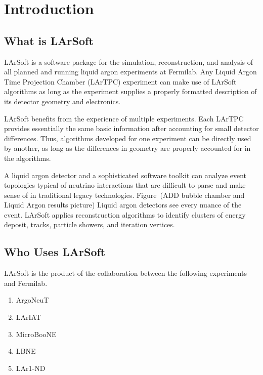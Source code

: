 \documentclass[12pt]{elsarticle}
\begin{document}
\maketitle

\section{Introduction}
\subsection{What is LArSoft}
LArSoft is a software package for the simulation, reconstruction, and analysis of all planned and running liquid argon experiments at Fermilab. Any Liquid Argon Time Projection Chamber (LArTPC) experiment can make use of LArSoft algorithms as long as the experiment supplies a properly formatted description of its detector geometry and electronics. 

LArSoft  benefits from the experience of multiple experiments.  Each LArTPC provides essentially the same basic information after accounting for small detector differences.  Thus, algorithms developed for one experiment can be directly used by another, as long as the differences in geometry are properly accounted for in the algorithms.  

A liquid argon detector and a sophisticated software toolkit can analyze event topologies typical of neutrino interactions that are difficult to parse and make sense of in traditional legacy technologies. Figure~(ADD bubble chamber and Liquid Argon results picture)
Liquid argon detectors see every nuance of the event. LArSoft applies reconstruction algorithms to identify clusters of energy deposit, tracks, particle showers, and iteration vertices.

\subsection{Who Uses LArSoft}
LArSoft is the product of the collaboration between the following experiments and Fermilab.
\begin{enumerate}
\item ArgoNeuT
\item LArIAT
\item MicroBooNE
\item LBNE
\item LAr1-ND
\end{enumerate}

\hspace*{2cm}
\begin{figure}[h]
\centering
\label{bubble}
\end{figure}
\end{document}
